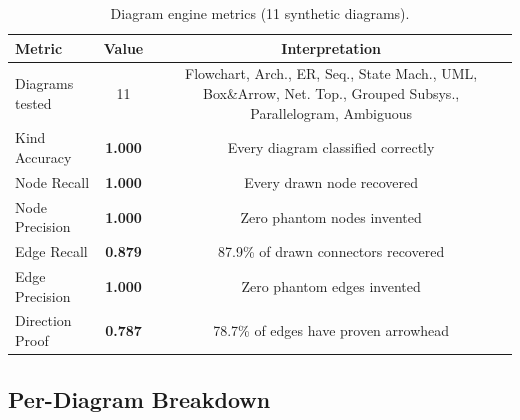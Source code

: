 \documentclass[10pt, conference, compsocconf]{IEEEtran}
\theoremstyle{plain}
\begin{document}
\begin{table}[t]
\centering
\caption{Diagram engine metrics (11 synthetic diagrams).}
\label{tab:diagram-metrics}
\footnotesize
\begin{tabular*}{\textwidth}{@{\extracolsep{\fill}}lcc@{}}
\toprule
\textbf{Metric} & \textbf{Value} & \textbf{Interpretation} \\
\midrule
Diagrams tested & 11 & Flowchart, Arch., ER, Seq., State Mach., UML, Box\&Arrow, Net. Top., Grouped Subsys., Parallelogram, Ambiguous \\
Kind Accuracy   & \textbf{1.000} & Every diagram classified correctly \\
Node Recall     & \textbf{1.000} & Every drawn node recovered \\
Node Precision  & \textbf{1.000} & Zero phantom nodes invented \\
Edge Recall     & \textbf{0.879} & 87.9\% of drawn connectors recovered \\
Edge Precision  & \textbf{1.000} & Zero phantom edges invented \\
Direction Proof & \textbf{0.787} & 78.7\% of edges have proven arrowhead \\
\bottomrule
\end{tabular*}
\end{table}

\subsection{Per-Diagram Breakdown}
\end{document}
